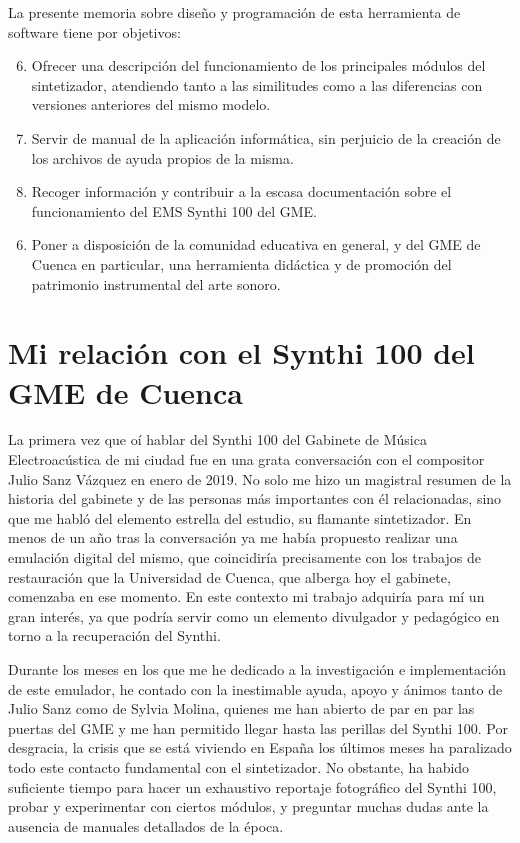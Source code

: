 La presente memoria sobre diseño y programación de esta herramienta de software tiene por objetivos:

\begin{enumerate}
	\setcounter{enumi}{5}
	\item Ofrecer una descripción del funcionamiento de los principales módulos del sintetizador, atendiendo tanto a las similitudes como a las diferencias con versiones anteriores del mismo modelo.
	\item Servir de manual de la aplicación informática, sin perjuicio de la creación de los archivos de ayuda propios de la misma.
	\item Recoger información y contribuir a la escasa documentación sobre el funcionamiento del EMS Synthi 100 del GME.
\end{enumerate}



\begin{enumerate}
	\setcounter{enumi}{5}
	\item Poner a disposición de la comunidad educativa en general, y del GME de Cuenca en particular, una herramienta didáctica y de promoción del patrimonio instrumental del arte sonoro.
\end{enumerate}



\section[Mi relación con el Synthi\dots]{Mi relación con el Synthi 100 del GME de Cuenca }

La primera vez que oí hablar del Synthi 100 del Gabinete de Música Electroacústica de mi ciudad fue en una grata conversación con el compositor Julio Sanz Vázquez en enero de 2019. No solo me hizo un magistral resumen de la historia del gabinete y de las personas más importantes con él relacionadas, sino que me habló del elemento estrella del estudio, su flamante sintetizador. En menos de un año tras la conversación ya me había propuesto realizar una emulación digital del mismo, que coincidiría precisamente con los trabajos de restauración que la Universidad de Cuenca, que alberga hoy el gabinete, comenzaba en ese momento. En este contexto mi trabajo adquiría para mí un gran interés, ya que podría servir como un elemento divulgador y pedagógico en torno a la recuperación del Synthi. 

Durante los meses en los que me he dedicado a la investigación e implementación de este emulador, he contado con la inestimable ayuda, apoyo y ánimos tanto de Julio Sanz como de Sylvia Molina, quienes me han abierto de par en par las puertas del GME y me han permitido llegar hasta las perillas del Synthi 100. Por desgracia, la crisis que se está viviendo en España los últimos meses ha paralizado todo este contacto fundamental con el sintetizador. No obstante, ha habido suficiente tiempo para hacer un exhaustivo reportaje fotográfico del Synthi 100, probar y experimentar con ciertos módulos, y preguntar muchas dudas ante la ausencia de manuales detallados de la época.


